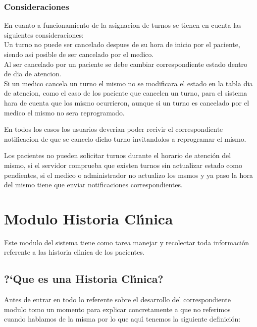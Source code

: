 \subsubsection{Consideraciones}

En cuanto a funcionamiento de la asignacion de turnos se tienen en cuenta las
siguientes consideraciones: \\[0.1cm]

Un turno no puede ser cancelado despues de su hora de inicio por el paciente, 
siendo asi posible de ser cancelado por el medico. \\[0.1cm]

Al ser cancelado por un paciente se debe cambiar correspondiente estado dentro 
de dia de atencion. \\[0.1cm]

 Si un medico cancela un turno el mismo no se modificara el estado en la tabla 
 dia de atencion, como el caso de los paciente que cancelen un turno, 
 para el sistema hara de cuenta que los mismo ocurrieron, aunque si un turno es 
 cancelado por el medico el mismo no sera reprogramado.

 En todos los casos los usuarios deverian poder recivir el correspondiente 
 notificacion de que se cancelo dicho turno invitandolos a reprogramar el mismo.

Los pacientes no pueden solicitar turnos durante el horario de atenci\'on del 
mismo, si el servidor comprueba que existen turnos sin actualizar estado como 
pendientes, si el medico o administrador no actualizo los msmos y ya paso la 
hora del mismo tiene que enviar notificaciones correspondientes. 



\section{Modulo Historia Cl\'{\i}nica}

Este modulo del sistema tiene como tarea manejar y recolectar toda informaci\'on 
referente a las historia cl\'{\i}nica de los pacientes.


\subsection{?`Que es una Historia Cl\'{\i}nica?}

Antes de entrar en todo lo referente sobre el desarrollo del correspondiente modulo
tomo un momento para explicar concretamente a que no referimos cuando hablamos de 
la misma por lo que aqu\'{\i} tenemos la siguiente definici\'on:

